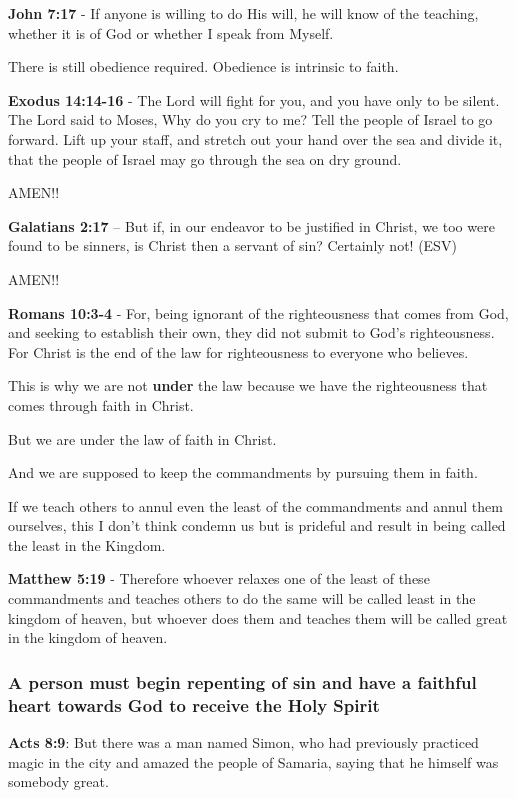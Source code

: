\documentclass[11pt]{article}
\begin{document}
\textbf{John 7:17} - If anyone is willing to do His will, he will know of the teaching, whether it is of God or whether I speak from Myself.

There is still obedience required. Obedience is intrinsic to faith.

\textbf{Exodus 14:14-16} - The Lord will fight for you, and you have only to be silent.  The Lord said to Moses, Why do you cry to me? Tell the people of Israel to go forward.  Lift up your staff, and stretch out your hand over the sea and divide it, that the people of Israel may go through the sea on dry ground.

AMEN!!

\textbf{Galatians 2:17} -- But if, in our endeavor to be justified in Christ, we too were found to be sinners, is Christ then a servant of sin? Certainly not! (ESV)

AMEN!!

\textbf{Romans 10:3-4} - For, being ignorant of the righteousness that comes from God, and seeking to establish their own, they did not submit to God's righteousness. For Christ is the end of the law for righteousness to everyone who believes.

This is why we are not \textbf{under} the law because we have the righteousness that comes through faith in Christ.

But we are under the law of faith in Christ.

And we are supposed to keep the commandments by pursuing them in faith.

If we teach others to annul even the least of the commandments and annul them ourselves, this I don't think condemn us but is prideful and result in being called the least in the Kingdom.

\textbf{Matthew 5:19} - Therefore whoever relaxes one of the least of these commandments and teaches others to do the same will be called least in the kingdom of heaven, but whoever does them and teaches them will be called great in the kingdom of heaven.

\subsubsection{A person must begin repenting of sin and have a faithful heart towards God to receive the Holy Spirit}
\label{sec:org503da28}
\textbf{Acts 8:9}: But there was a man named Simon, who had previously practiced magic in the city and amazed the people of Samaria, saying that he himself was somebody great.
\end{document}
